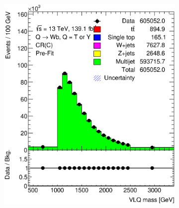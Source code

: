 \begin{figure}[hbt!]
\begin{subfigure}{.35\textwidth}
		\caption{}
		\label{fig:app:cr_c:jet_pt}
	\end{subfigure}
	\begin{subfigure}{.35\textwidth}
		\centering
		\includegraphics[width=\linewidth,height=\textheight,keepaspectratio]{CR_C_VLQM.eps}
		\caption{}
		\label{fig:app:cr_c:VLQM}
	\end{subfigure}\hspace{0.6cm}
	\begin{subfigure}{.35\textwidth}
		\centering

\end{subfigure}
\end{figure}
